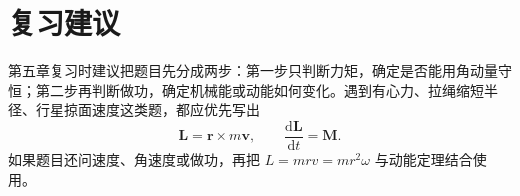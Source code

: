 \documentclass[11pt,a4paper]{ctexart}
\newcommand{\dd}{\mathrm{d}}
\begin{document}
\section*{复习建议}

第五章复习时建议把题目先分成两步：第一步只判断力矩，确定是否能用角动量守恒；第二步再判断做功，确定机械能或动能如何变化。遇到有心力、拉绳缩短半径、行星掠面速度这类题，都应优先写出
\[
  \bm L=\bm r\times m\bm v,
  \qquad
  \frac{\dd\bm L}{\dd t}=\bm M.
\]
如果题目还问速度、角速度或做功，再把 $L=mrv=mr^2\omega$ 与动能定理结合使用。
\end{document}
